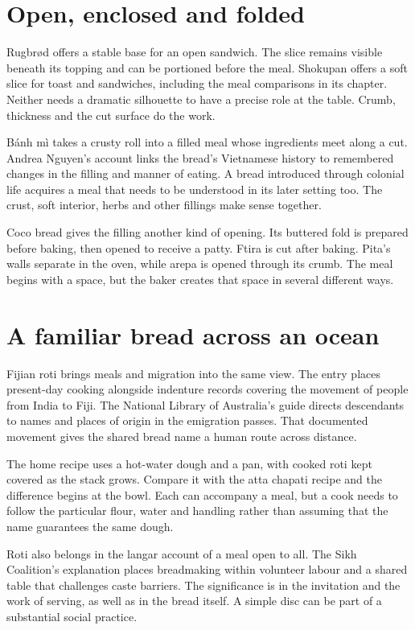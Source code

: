 \section{Open, enclosed and folded}
Rugbrød offers a stable base for an open sandwich. The slice remains visible beneath its topping and can be portioned before the meal. Shokupan offers a soft slice for toast and sandwiches, including the meal comparisons in its chapter. Neither needs a dramatic silhouette to have a precise role at the table. Crumb, thickness and the cut surface do the work.\citep{dkrye,namishokupanmeals07}

Bánh mì takes a crusty roll into a filled meal whose ingredients meet along a cut. Andrea Nguyen's account links the bread's Vietnamese history to remembered changes in the filling and manner of eating. A bread introduced through colonial life acquires a meal that needs to be understood in its later setting too. The crust, soft interior, herbs and other fillings make sense together.\citep{nguyenhistorykqed07,nguyenmaster07}

Coco bread gives the filling another kind of opening. Its buttered fold is prepared before baking, then opened to receive a patty. Ftira is cut after baking. Pita's walls separate in the oven, while arepa is opened through its crumb. The meal begins with a space, but the baker creates that space in several different ways.\citep{harriscoco08,ftirafilling}

\section{A familiar bread across an ocean}
Fijian roti brings meals and migration into the same view. The entry places present-day cooking alongside indenture records covering the movement of people from India to Fiji. The National Library of Australia's guide directs descendants to names and places of origin in the emigration passes. That documented movement gives the shared bread name a human route across distance.\citep{nlagirmit09,unescogirmit09}

The home recipe uses a hot-water dough and a pan, with cooked roti kept covered as the stack grows. Compare it with the atta chapati recipe and the difference begins at the bowl. Each can accompany a meal, but a cook needs to follow the particular flour, water and handling rather than assuming that the name guarantees the same dough.\citep{manaliroti06,jangroti09}

Roti also belongs in the langar account of a meal open to all. The Sikh Coalition's explanation places breadmaking within volunteer labour and a shared table that challenges caste barriers. The significance is in the invitation and the work of serving, as well as in the bread itself. A simple disc can be part of a substantial social practice.\citep{sikhlangar06}

